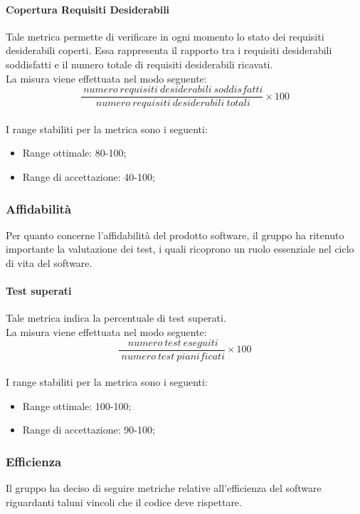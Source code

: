 			\paragraph{Copertura Requisiti Desiderabili}
			Tale metrica permette di verificare in ogni momento lo stato dei requisiti desiderabili coperti. Essa rappresenta il rapporto tra i requisiti desiderabili soddisfatti e il numero totale di requisiti desiderabili ricavati.
			\\La misura viene effettuata nel modo seguente:
			\begin{equation}
			\frac{~numero~requisiti~desiderabili~soddisfatti}{~numero~requisiti~desiderabili~totali}\times{100}
			\end{equation}
			\\I range stabiliti per la metrica sono i seguenti:
			\begin{itemize}
				\item Range ottimale: 80-100;
				\item Range di accettazione: 40-100;
			\end{itemize}
		\subsubsection{Affidabilità \label{S2}}
		Per quanto concerne l'affidabilità del prodotto software, il gruppo ha ritenuto importante la valutazione dei test, i quali ricoprono un ruolo essenziale nel ciclo di vita del software.
			\paragraph{Test superati}
			Tale metrica indica la percentuale di test superati.
			\\La misura viene effettuata nel modo seguente:
			\begin{equation}
				\frac{~numero~test~eseguiti}{~numero~test~pianificati}\times{100}
			\end{equation}
			\\I range stabiliti per la metrica sono i seguenti:
			\begin{itemize}
				\item Range ottimale: 100-100;
				\item Range di accettazione: 90-100;
			\end{itemize}
		\subsubsection{Efficienza \label{S3}}
		Il gruppo \hx{} ha deciso di seguire metriche relative all'efficienza del software riguardanti taluni vincoli che il codice deve rispettare.

